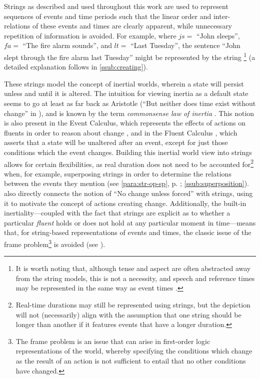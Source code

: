 \documentclass[a4paper,12pt,leqno,twoside]{article}
\newcommand{\vph}[1]{\vphantom{#1}}
\newcommand{\ebox}[1]{\fbox{$\vph{'(),}#1$}}
\newcommand{\EventString}[1]{%
	\renewcommand*{\do}[1]{\ebox{##1}}%
	\PipeParser{#1}%
}
\begin{document}
Strings as described and used throughout this work are used to represent sequences of events and time periods such that the linear order and inter-relations of these events and times are clearly apparent, while unnecessary repetition of information is avoided. For example, where $js =$ ``John sleeps'', $fa =$ ``The fire alarm sounds'', and $lt =$ ``Last Tuesday'', the sentence ``John slept through the fire alarm last Tuesday'' might be represented by the string \EventString{{}|lt|js,lt|fa,js,lt|js,lt|lt|{}}\footnote{It is worth noting that, although tense and aspect are often abstracted away from the string models, this is not a necessity, and speech and reference times may be represented in the same way as event times \citep{fernando2016regular,Derczynski2013,reichenbach1947elements}.} (a detailed explanation follows in \cref{ssub:creating}).

These strings model the concept of inertial worlds, wherein a state will persist unless and until it is altered. The intuition for viewing inertia as a default state seems to go at least as far back as Aristotle (``But neither does time exist without change'' in \textit{}), and is known by the term \textit{commonsense law of inertia} \citep[p. 19]{shanahan1997solving}. This notion is also present in the Event Calculus, which represents the effects of actions on fluents in order to reason about change \citep{Kowalski1986,Miller1999,Mueller2008}, and in the Fluent Calculus \citep{thielscher1999situation}, which asserts that a state will be unaltered after an event, except for just those conditions which the event changes.
Building this inertial world view into strings allows for certain flexibilities, as real duration does not need to be accounted for\footnote{Real-time durations may still be represented using strings, but the depiction will not (necessarily) align with the assumption that one string should be longer than another if it features events that have a longer duration.} when, for example, superposing strings in order to determine the relations between the events they mention (see \cref{para:str-op-sp}, p. \pageref{para:str-op-sp}; \cref{ssub:superposition}). \citet[p. 44]{Fernando2018} also directly connects the notion of ``No change unless forced'' with strings, using it to motivate the concept of actions creating change. Additionally, the built-in inertiality---coupled with the fact that strings are explicit as to whether a particular \textit{fluent} holds or does not hold at any particular moment in time---means that, for string-based representations of events and times, the classic issue of the frame problem\footnote{The frame problem is an issue that can arise in first-order logic representations of the world, whereby specifying the conditions which change as the result of an action is not sufficient to entail that no other conditions have changed.} is avoided (see \citet[pp. 30-31]{Mccarthy69somephilosophical}).
\end{document}
